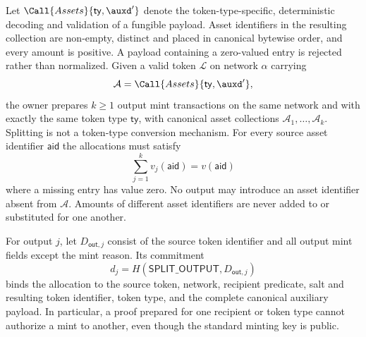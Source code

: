 Let $\Call{Assets}{\mathsf{ty},\auxd'}$ denote the token-type-specific, deterministic decoding and validation of a fungible payload.  Asset identifiers in the resulting collection are non-empty, distinct and placed in canonical bytewise order, and every amount is positive.  A payload containing a zero-valued entry is rejected rather than normalized.  Given a valid token $\mathcal{L}$ on network $\alpha$ carrying
\[
\mathcal{A}=\Call{Assets}{\mathsf{ty},\auxd'},
\]
the owner prepares $k \geq 1$ output mint transactions on the same network and with exactly the same token type $\mathsf{ty}$, with canonical asset collections $\mathcal{A}_1,\ldots,\mathcal{A}_k$.  Splitting is not a token-type conversion mechanism.  For every source asset identifier $\mathsf{aid}$ the allocations must satisfy
\[
\sum_{j=1}^{k} v_j(\mathsf{aid}) = v(\mathsf{aid})
\]
where a missing entry has value zero.  No output may introduce an asset identifier absent from $\mathcal{A}$.  Amounts of different asset identifiers are never added to or substituted for one another.

For output $j$, let $D_{\mathsf{out},j}$ consist of the source token identifier and all output mint fields except the mint reason.  Its commitment
\[
d_j = H(\mathsf{SPLIT\_OUTPUT},D_{\mathsf{out},j})
\]
binds the allocation to the source token, network, recipient predicate, salt and resulting token identifier, token type, and the complete canonical auxiliary payload.  In particular, a proof prepared for one recipient or token type cannot authorize a mint to another, even though the standard minting key is public.

